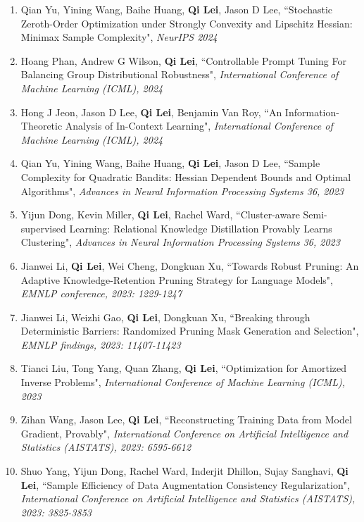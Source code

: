 \documentclass[margin, 10pt]{res} %
\begin{document}
\begin{resume}
\begin{enumerate}
\item{Qian Yu, Yining Wang, Baihe Huang, \textbf{Qi Lei}, Jason D Lee, ``Stochastic Zeroth-Order Optimization under Strongly Convexity and Lipschitz Hessian: Minimax Sample Complexity", \textit{NeurIPS 2024} }
	
\item{Hoang Phan, Andrew G Wilson, \textbf{Qi Lei}, ``Controllable Prompt Tuning For Balancing Group Distributional Robustness", \textit{International Conference of Machine Learning (ICML), 2024}}

\item{Hong J Jeon, Jason D Lee, \textbf{Qi Lei}, Benjamin Van Roy, ``An Information-Theoretic Analysis of In-Context Learning", \textit{International Conference of Machine Learning (ICML), 2024}
}

\item{Qian Yu, Yining Wang, Baihe Huang, \textbf{Qi Lei}, Jason D Lee, ``Sample Complexity for Quadratic Bandits: Hessian Dependent Bounds and Optimal Algorithms", \textit{Advances in Neural Information Processing Systems 36, 2023}}
	
\item{Yijun Dong, Kevin Miller, \textbf{Qi Lei}, Rachel Ward, ``Cluster-aware Semi-supervised Learning: Relational Knowledge Distillation Provably Learns Clustering", \textit{Advances in Neural Information Processing Systems 36, 2023}}
	
\item{Jianwei Li, \textbf{Qi Lei}, Wei Cheng, Dongkuan Xu, ``Towards Robust Pruning: An Adaptive Knowledge-Retention Pruning Strategy for Language Models", \textit{EMNLP conference, 2023: 1229-1247}}

\item{Jianwei Li, Weizhi Gao, \textbf{Qi Lei}, Dongkuan Xu, ``Breaking through Deterministic Barriers: Randomized Pruning Mask Generation and Selection", \textit{EMNLP findings, 2023: 11407-11423}}
	
\item{Tianci Liu, Tong Yang, Quan Zhang, \textbf{Qi Lei}, ``Optimization for Amortized Inverse Problems", \textit{International Conference of Machine Learning (ICML), 2023}}
	
\item{Zihan Wang, Jason Lee, \textbf{Qi Lei}, ``Reconstructing Training Data from Model Gradient, Provably", \textit{International Conference on
		Artificial Intelligence and Statistics (AISTATS), 2023: 6595-6612}}
	
\item{Shuo Yang, Yijun Dong, Rachel Ward, Inderjit Dhillon, Sujay Sanghavi, \textbf{Qi Lei}, ``Sample Efficiency of Data Augmentation Consistency Regularization", \textit{International Conference on
			Artificial Intelligence and Statistics (AISTATS), 2023: 3825-3853}}
	

\end{enumerate}
\end{resume}
\end{document}
